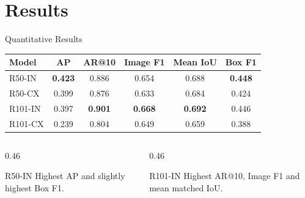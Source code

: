 \documentclass[aspectratio=169,11pt]{beamer}
\begin{document}

\section{Results}


\begin{frame}{Quantitative Results}

\begin{center}
\small

\begin{tabular}{lccccc}
\toprule
\textbf{Model} &
\textbf{AP} &
\textbf{AR@10} &
\textbf{Image F1} &
\textbf{Mean IoU} &
\textbf{Box F1} \\
\midrule
R50-IN  & \textbf{0.423} & 0.886 & 0.654 & 0.688 & \textbf{0.448} \\
R50-CX  & 0.399 & 0.876 & 0.633 & 0.684 & 0.424 \\
R101-IN & 0.397 & \textbf{0.901} & \textbf{0.668} &
          \textbf{0.692} & 0.446 \\
R101-CX & 0.239 & 0.804 & 0.649 & 0.659 & 0.388 \\
\bottomrule
\end{tabular}

\end{center}

\vspace{0.45cm}

\begin{columns}

\begin{column}{0.46\textwidth}

\begin{block}{R50-IN}
\centering
Highest AP and slightly highest Box F1.
\end{block}

\end{column}

\begin{column}{0.46\textwidth}

\begin{block}{R101-IN}
\centering
Highest AR@10, Image F1 and mean matched IoU.
\end{block}

\end{column}

\end{columns}

\end{frame}
\end{document}

